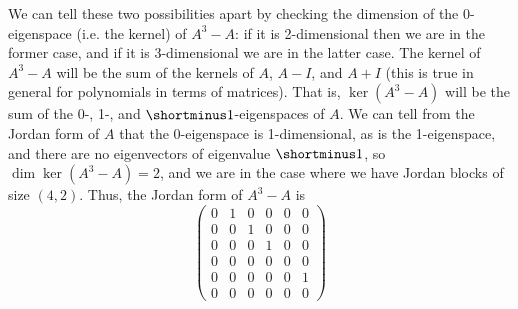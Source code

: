 \begin{solution}
\begin{enumerate}
    We can tell these two possibilities apart by checking the dimension of the 0-eigenspace (i.e. the kernel) of $A^3-A$: if it is 2-dimensional then we are in the former case, and if it is 3-dimensional we are in the latter case. The kernel of $A^3-A$ will be the sum of the kernels of $A$, $A-I$, and $A+I$ (this is true in general for polynomials in terms of matrices). That is, $\ker (A^3-A)$ will be the sum of the 0-, 1-, and $\shortminus 1$-eigenspaces of $A$. We can tell from the Jordan form of $A$ that the 0-eigenspace is 1-dimensional, as is the 1-eigenspace, and there are no eigenvectors of eigenvalue $\shortminus1$, so $\dim \ker (A^3-A) = 2$, and we are in the case where we have Jordan blocks of size $(4,2)$. Thus, the Jordan form of $A^3-A$ is
    \[
    \begin{pmatrix}
    0 & 1 & 0 & 0 & 0 & 0\\
    0 & 0 & 1 & 0 & 0 & 0\\
    0 & 0 & 0 & 1 & 0 & 0\\
    0 & 0 & 0 & 0 & 0 & 0\\
    0 & 0 & 0 & 0 & 0 & 1\\
    0 & 0 & 0 & 0 & 0 & 0
    \end{pmatrix}
    \]
\end{enumerate}
\end{solution}

